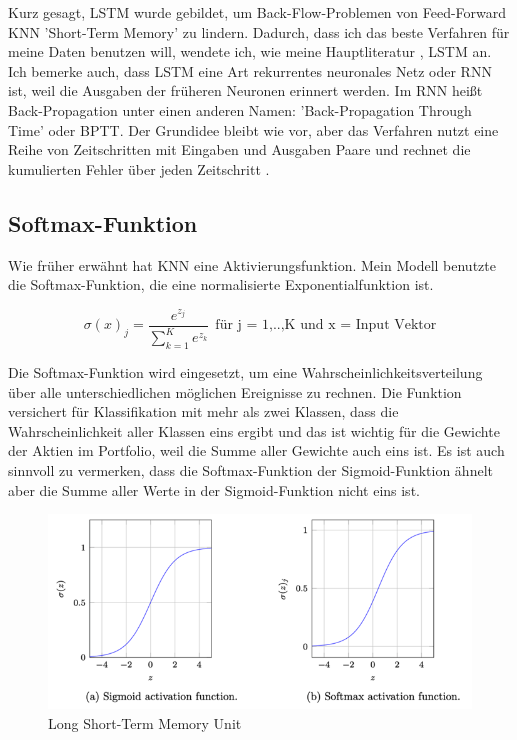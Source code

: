 \documentclass[12pt]{article}
\begin{document}
            Kurz gesagt, LSTM wurde gebildet, um Back-Flow-Problemen von Feed-Forward KNN 'Short-Term Memory' zu lindern. 
            Dadurch, dass ich das beste Verfahren für meine Daten benutzen will, 
            wendete ich, wie meine Hauptliteratur \cite{zhang2020}, LSTM an. 
            Ich bemerke auch, dass LSTM eine Art rekurrentes neuronales Netz oder RNN ist, 
            weil die Ausgaben der früheren Neuronen erinnert werden. Im RNN heißt Back-Propagation unter einen anderen Namen: 
            'Back-Propagation Through Time' oder BPTT. 
            Der Grundidee bleibt wie vor, aber das Verfahren nutzt eine Reihe von Zeitschritten mit Eingaben und Ausgaben Paare und 
            rechnet die kumulierten Fehler über jeden Zeitschritt \cite{brownlee2020}.

        \subsection{Softmax-Funktion}

            Wie früher erwähnt hat KNN eine Aktivierungsfunktion. Mein Modell benutzte die Softmax-Funktion, 
            die eine normalisierte Exponentialfunktion ist. 
            
            \[ \sigma(x)_j = \frac{e^{z_j}}{\sum_{k=1}^{K} e^{z_k}} \ \ \textrm{für j = 1,..,K und x = Input Vektor}  \]
            
            Die Softmax-Funktion wird eingesetzt, 
            um eine Wahrscheinlichkeitsverteilung über alle unterschiedlichen möglichen Ereignisse zu rechnen. 
            Die Funktion versichert für Klassifikation mit mehr als zwei Klassen, 
            dass die Wahrscheinlichkeit aller Klassen eins ergibt und das ist wichtig für die Gewichte der Aktien im Portfolio, 
            weil die Summe aller Gewichte auch eins ist. Es ist auch sinnvoll zu vermerken, 
            dass die Softmax-Funktion der Sigmoid-Funktion ähnelt aber die Summe aller Werte in der Sigmoid-Funktion nicht eins ist.

            \begin{figure}[ht]
            
                \begin{center}

                    \includegraphics[scale=0.6]{sigmoid-datacamp.png}
                    \caption{Long Short-Term Memory Unit \cite{data-basecamp}}
        
                \end{center}
                
            \end{figure}
\end{document}
